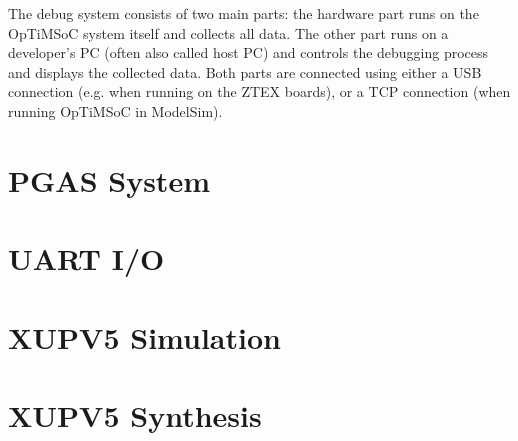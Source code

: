 The debug system consists of two main parts: the hardware part runs on the
OpTiMSoC system itself and collects all data. The other part runs on a
developer's PC (often also called host PC) and controls the debugging process
and displays the collected data. Both parts are connected using either a USB
connection (e.g. when running on the ZTEX boards), or a TCP connection (when
running OpTiMSoC in ModelSim).



\section{PGAS System}



\section{UART I/O}




\section{XUPV5 Simulation}


\section{XUPV5 Synthesis}


